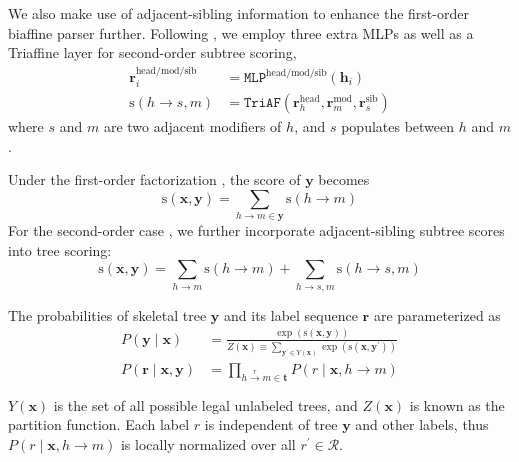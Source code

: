 \documentclass[11pt]{article}
\begin{document}
We also make use of adjacent-sibling information \cite{mcdonald-pereira-2006-online} to enhance the first-order biaffine parser further.
Following \citet{wang-etal-2019-second,zhang-etal-2020-efficient}, we employ three extra MLPs as well as a Triaffine layer for second-order subtree scoring,
\begin{equation}
    \begin{aligned}
        \mathbf{r}^{\mathrm{head}/\mathrm{mod}/\mathrm{sib}}_i & = \mathtt{MLP}^{\mathrm{head}/\mathrm{mod}/\mathrm{sib}}(\mathbf{h}_i)                                                  \\
        \mathrm{s}(h\rightarrow {s,m})                         & = \mathtt{TriAF}\left(\mathbf{r}^{\mathrm{head}}_{h},\mathbf{r}^{\mathrm{mod}}_{m},\mathbf{r}^{\mathrm{sib}}_{s}\right)
    \end{aligned}
\end{equation}
where $s$ and $m$ are two adjacent modifiers of $h$, and $s$ populates between $h$ and $m$.

Under the first-order factorization \cite{mcdonald-etal-2005-online}, the score of $\boldsymbol{y}$ becomes
\begin{equation}\label{eq:tree-score}
    \mathrm{s}(\boldsymbol{x},\boldsymbol{y})=\sum\limits_{h\rightarrow m \in \boldsymbol{y}}\mathrm{s}(h\rightarrow m)
\end{equation}
For the second-order case \cite{mcdonald-pereira-2006-online}, we further incorporate adjacent-sibling subtree scores into tree scoring:
\begin{equation}\label{eq:2otree-score}
    \mathrm{s}(\boldsymbol{x},\boldsymbol{y})=\sum\limits_{h\rightarrow m}\mathrm{s}(h\rightarrow m)+\sum\limits_{h\rightarrow {s,m}}\mathrm{s}(h\rightarrow {s,m})
\end{equation}

The probabilities of skeletal tree $\boldsymbol{y}$ and its label sequence $\boldsymbol{r}$ are parameterized as
\begin{equation}
    \begin{aligned}
        P(\boldsymbol{y}\mid \boldsymbol{x})               & =\frac{\exp\left(\mathrm{s}(\boldsymbol{x},\boldsymbol{y})\right)}{Z(\boldsymbol{x})\equiv\sum_{\boldsymbol{y}^{\prime}\in Y(\boldsymbol{x})}\exp\left(\mathrm{s}(\boldsymbol{x},\boldsymbol{y}^{\prime})\right)} \\
        P(\boldsymbol{r}\mid\boldsymbol{x},\boldsymbol{y}) & =\prod\limits_{h\xrightarrow[]{r}m \in \boldsymbol{t}} P(r\mid \boldsymbol{x},h\rightarrow m)                                                                                                                     \\
    \end{aligned}
\end{equation}
$Y(\boldsymbol{x})$ is the set of all possible legal unlabeled trees, and $Z(\boldsymbol{x})$ is known as the partition function.
Each label $r$ is independent of tree $\boldsymbol{y}$ and other labels, thus $P(r\mid \boldsymbol{x},h\rightarrow m)$ is locally normalized over all $r^{\prime}\in \mathcal{R}$.
\end{document}
